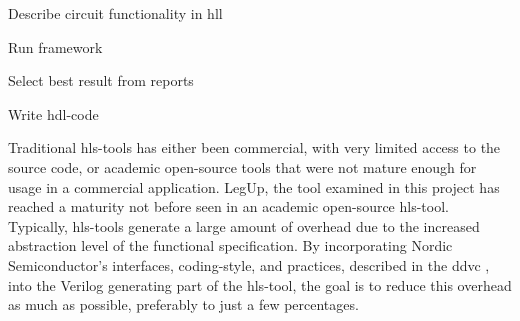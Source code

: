 \begin{compactenum}
    \item Describe circuit functionality in \gls{hll}
    \item Run framework
    \item Select best result from reports
    \item Write \gls{hdl}-code
\end{compactenum}
Traditional \gls{hls}-tools has either been commercial, with very limited access to the source code, or academic open-source tools that were not mature enough for usage in a commercial application. LegUp, the tool examined in this project has reached a maturity not before seen in an academic open-source \gls{hls}-tool. Typically, \gls{hls}-tools generate a large amount of overhead due to the increased abstraction level of the functional specification. By incorporating Nordic Semiconductor's interfaces, coding-style, and practices, described in the \gls{ddvc} \cite{nordicddvc}, into the Verilog generating part of the \gls{hls}-tool, the goal is to reduce this overhead as much as possible, preferably to just a few percentages.

